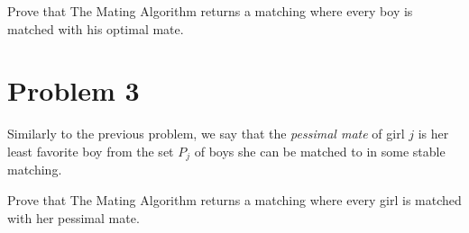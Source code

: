 \documentclass[12pt]{article}
\begin{document}
Prove that The Mating Algorithm returns a matching where every boy is matched with his optimal mate.


\section*{Problem 3}
Similarly to the previous problem, we say that the \emph{pessimal mate} of girl $j$ is her least favorite boy from the set $P_j$ of boys she can be matched to in some stable matching. 

Prove that The Mating Algorithm returns a matching where every girl is matched with her pessimal mate.

\end{document}
